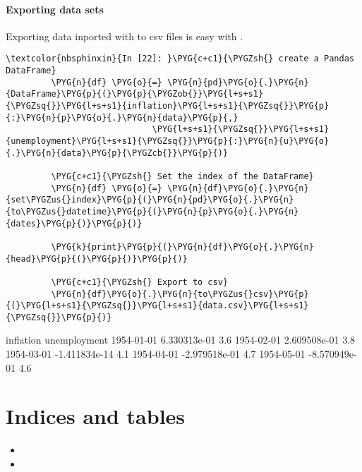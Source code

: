 \documentclass[letterpaper,10pt,openany,oneside,english]{sphinxmanual}
\begin{document}
\subsubsection{Exporting data sets}
\label{\detokenize{fredpy_examples:Exporting-data-sets}}
Exporting data inported with  to csv files is easy with
.

\begin{Verbatim}[commandchars=\\\{\}]
\textcolor{nbsphinxin}{In [22]: }\PYG{c+c1}{\PYGZsh{} create a Pandas DataFrame}
         \PYG{n}{df} \PYG{o}{=} \PYG{n}{pd}\PYG{o}{.}\PYG{n}{DataFrame}\PYG{p}{(}\PYG{p}{\PYGZob{}}\PYG{l+s+s1}{\PYGZsq{}}\PYG{l+s+s1}{inflation}\PYG{l+s+s1}{\PYGZsq{}}\PYG{p}{:}\PYG{n}{p}\PYG{o}{.}\PYG{n}{data}\PYG{p}{,}
                             \PYG{l+s+s1}{\PYGZsq{}}\PYG{l+s+s1}{unemployment}\PYG{l+s+s1}{\PYGZsq{}}\PYG{p}{:}\PYG{n}{u}\PYG{o}{.}\PYG{n}{data}\PYG{p}{\PYGZcb{}}\PYG{p}{)}
         
         \PYG{c+c1}{\PYGZsh{} Set the index of the DataFrame}
         \PYG{n}{df} \PYG{o}{=} \PYG{n}{df}\PYG{o}{.}\PYG{n}{set\PYGZus{}index}\PYG{p}{(}\PYG{n}{pd}\PYG{o}{.}\PYG{n}{to\PYGZus{}datetime}\PYG{p}{(}\PYG{n}{p}\PYG{o}{.}\PYG{n}{dates}\PYG{p}{)}\PYG{p}{)}
         
         \PYG{k}{print}\PYG{p}{(}\PYG{n}{df}\PYG{o}{.}\PYG{n}{head}\PYG{p}{(}\PYG{p}{)}\PYG{p}{)}
         
         \PYG{c+c1}{\PYGZsh{} Export to csv}
         \PYG{n}{df}\PYG{o}{.}\PYG{n}{to\PYGZus{}csv}\PYG{p}{(}\PYG{l+s+s1}{\PYGZsq{}}\PYG{l+s+s1}{data.csv}\PYG{l+s+s1}{\PYGZsq{}}\PYG{p}{)}
\end{Verbatim}
\begin{OriginalVerbatim}[commandchars=\\\{\}]
               inflation  unemployment
1954-01-01  6.330313e-01           3.6
1954-02-01  2.609508e-01           3.8
1954-03-01 -1.411834e-14           4.1
1954-04-01 -2.979518e-01           4.7
1954-05-01 -8.570949e-01           4.6
\end{OriginalVerbatim}

\chapter{Indices and tables}
\label{\detokenize{index:indices-and-tables}}\begin{itemize}
\item {} 

\item {} 

\end{itemize}



\renewcommand{\indexname}{Index}
\printindex
\end{document}
